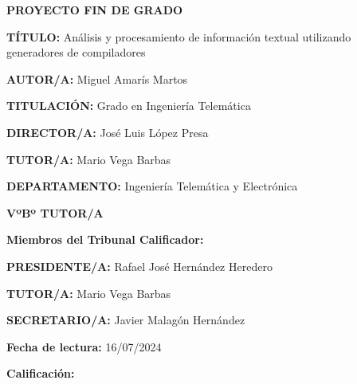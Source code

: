 \vspace{8,5cm}
\begin{center}
	{\fontsize{20}{24} \textbf{PROYECTO FIN DE GRADO} } \\
	
\end{center}
\vspace{1,3cm}
\begin{adjustwidth}{3cm}{4cm}
	{\setlength{\parskip}{0pt} \setlength{\parindent}{0pt}


{\fontsize{11}{13,2}
	{\textbf{TÍTULO:}  Análisis y procesamiento de información textual utilizando
		generadores de compiladores }\vspace{19pt}
	
	
	{\textbf{AUTOR/A:} Miguel Amarís Martos}\vspace{19pt}
	
	{\textbf{TITULACIÓN:} Grado en Ingeniería Telemática}\vspace{19pt}
	
	{\textbf{DIRECTOR/A:} José Luis López Presa} \vspace{19pt}
	
	{\textbf{TUTOR/A:} Mario Vega Barbas} \vspace{19pt}
	
	{\textbf{DEPARTAMENTO:} Ingeniería Telemática y Electrónica}\vspace{19pt}
	
	\hspace*{\fill}	{\textbf{VºBº TUTOR/A}  }\vspace{17pt}
	
	{\textbf{Miembros del Tribunal Calificador:}}\vspace{19pt}
	
	{\textbf{PRESIDENTE/A:} Rafael José Hernández Heredero}\vspace{19pt}
	
	{\textbf{TUTOR/A:} Mario Vega Barbas}\vspace{19pt}
	
	{\textbf{SECRETARIO/A:} Javier Malagón Hernández}\vspace{19pt}
	
	{\textbf{Fecha de lectura:} 16/07/2024}\vspace{19pt}
	
	{\textbf{Calificación:} }\vspace{19pt}
	
	\vspace{19pt}
}
}
\end{adjustwidth}

\restoregeometry